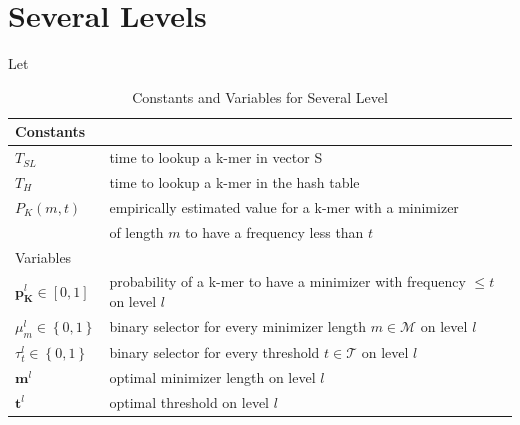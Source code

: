 \documentclass{article}
\newcommand{\timeForLookupInS}{{T_{SL}}}
\newcommand{\timeForHashtable}{{T_H}}
\newcommand{\percKmers}{\textbf{p}_\textbf{K}}
\newcommand{\percKmersEmpiric}{P_{K}}
\newcommand{\possibleMinimizerLength}{\mathcal{M}}
\newcommand{\possibleThresholds}{\mathcal{T}}
\newcommand{\minimizerLength}{\textbf{m}}
\newcommand{\threshold}{\textbf{t}}
\newcommand{\selectorm}{\mu}
\newcommand{\selectort}{\tau}
\begin{document}
\newpage
\section*{Several Levels}
Let
\begin{table}
	\caption{Constants and Variables for Several Level}
	\begin{tabular}{|| l | l ||}
		\hline
		Constants	&  \\
		\hline
		$\timeForLookupInS$		& time to lookup a k-mer in vector S\\
		$\timeForHashtable$		& time to lookup a k-mer in the hash table \\
		$\percKmersEmpiric(m, t)$ &empirically estimated value for a k-mer with a minimizer \\
		& of length $m$ to have a frequency less than $t$ \\
		\hline
		\hline
		Variables	&  \\
		\hline
		$\percKmers^l \in \left[0,1\right]$ & probability of a k-mer to have a minimizer with frequency $\leq t$ on level $l$ \\
		$\selectorm_m^l \in \left\{0, 1\right\}$	& binary selector for every minimizer length $m \in \possibleMinimizerLength$ on level $l$\\
		$\selectort_t^l \in \left\{0, 1\right\}$	& binary selector for every threshold $t \in \possibleThresholds$ on level $l$\\
		$\minimizerLength^l$ & optimal minimizer length on level $l$\\
		$\threshold^l$ & optimal threshold on level $l$\\
		\hline 
	\end{tabular}\\
\end{table}
\end{document}
